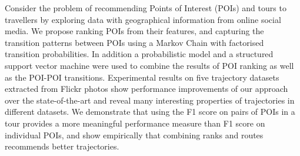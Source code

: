 Consider the problem of recommending Points of Interest (POIs) and tours to travellers
by exploring data with geographical information from online social media.
We propose ranking POIs from their features, and capturing the transition patterns between POIs
using a Markov Chain with factorised transition probabilities.
In addition a probabilistic model and a structured support vector machine were used
to combine the results of POI ranking as well as the POI-POI transitions.
Experimental results on five trajectory datasets extracted from Flickr photos show performance
improvements of our approach over the state-of-the-art and reveal many interesting properties
of trajectories in different datasets.
We demonstrate that using the F1 score on pairs of POIs in a tour provides a more
meaningful performance measure than F1 score on individual POIs, and show empirically that
combining ranks and routes recommends better trajectories.
